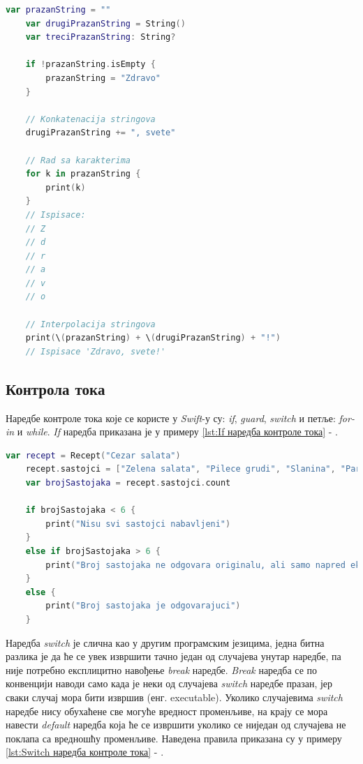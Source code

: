 \documentclass[12pt,oneside]{memoir}
\begin{document}
\begin{lstlisting}[caption=\textit{{Операције над стринговима}}, label={lst:Операције над стринговима}, language=Swift, frame=single]
    var prazanString = ""
    var drugiPrazanString = String()
    var treciPrazanString: String?
    
    if !prazanString.isEmpty {
        prazanString = "Zdravo"
    }
    
    // Konkatenacija stringova
    drugiPrazanString += ", svete"
    
    // Rad sa karakterima
    for k in prazanString {
        print(k)
    }
    // Ispisace: 
    // Z
    // d
    // r
    // a
    // v
    // o
    
    // Interpolacija stringova
    print(\(prazanString) + \(drugiPrazanString) + "!")
    // Ispisace 'Zdravo, svete!'
\end{lstlisting}

\subsection{Контрола тока}

\indent Наредбе контроле тока које се користе у \textit{Swift}-у су: \textit{if}, \textit{guard}, \textit{switch} и петље: \textit{for-in} и \textit{while}. \textit{If} наредба приказана је у примеру \ref{lst:If наредба контроле тока} - .

\begin{lstlisting}[caption=\textit{{If наредбa контроле тока}}, label={lst:If наредба контроле тока}, language=Swift, frame=single]
    var recept = Recept("Cezar salata")
    recept.sastojci = ["Zelena salata", "Pilece grudi", "Slanina", "Paradajz", "Hleb", "Cezar premaz"]
    var brojSastojaka = recept.sastojci.count
    
    if brojSastojaka < 6 {
        print("Nisu svi sastojci nabavljeni")
    }
    else if brojSastojaka > 6 {
        print("Broj sastojaka ne odgovara originalu, ali samo napred eksperimentisi")
    }
    else {
        print("Broj sastojaka je odgovarajuci")
    }
\end{lstlisting}

\indent Наредба \textit{switch} је слична као у другим програмским језицима, једна битна разлика је да ће се увек извршити тачно један од случајева унутар наредбе, па није потребно експлицитно навођење \textit{break} наредбе. \textit{Break} наредба се по конвенцији наводи само када је неки од случајева \textit{switch} наредбе празан, јер сваки случај мора бити извршив (енг. executable). Уколико случајевима \textit{switch} наредбе нису обухаћене све могуће вредност променљиве, на крају се мора навести \textit{default} наредба која ће се извршити уколико се ниједан од случајева не поклапа са вредношћу променљиве.  Наведена правила приказана су у примеру \ref{lst:Switch наредба контроле тока} - .
\end{document}
